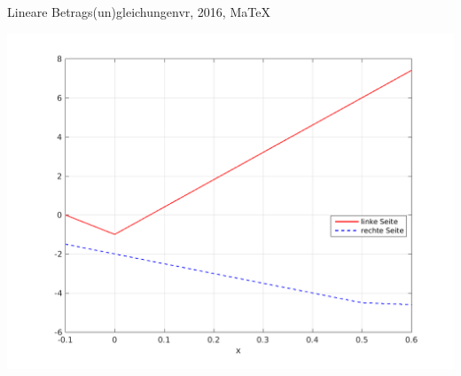 \begin{MAufgabe}{Lineare Betrags(un)gleichungen}{vr, 2016, MaTeX}
 \begin{center}
 \includegraphics[width=0.8\linewidth]{Abb_zur_Ag_autogenerated_ineq_6.png} \end{center}
 
\else\relax\fi
 \end{MAufgabe}